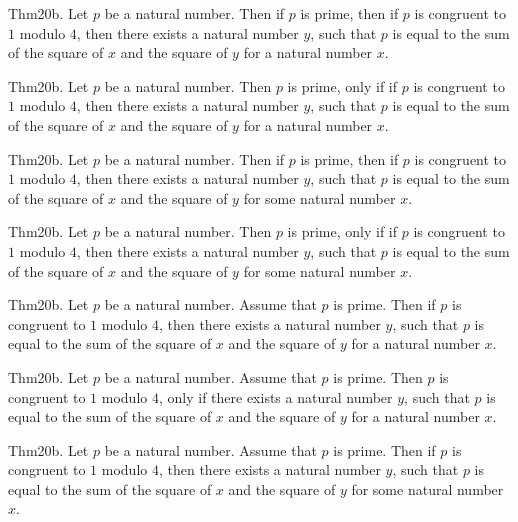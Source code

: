 \documentclass{article}
\begin{document}
Thm20b. Let $p$ be a natural number. Then if $p$ is prime, then if $p$ is congruent to $1$ modulo $4$, then there exists a natural number $y$, such that $p$ is equal to the sum of the square of $x$ and the square of $y$ for a natural number $x$.

Thm20b. Let $p$ be a natural number. Then $p$ is prime, only if if $p$ is congruent to $1$ modulo $4$, then there exists a natural number $y$, such that $p$ is equal to the sum of the square of $x$ and the square of $y$ for a natural number $x$.

Thm20b. Let $p$ be a natural number. Then if $p$ is prime, then if $p$ is congruent to $1$ modulo $4$, then there exists a natural number $y$, such that $p$ is equal to the sum of the square of $x$ and the square of $y$ for some natural number $x$.

Thm20b. Let $p$ be a natural number. Then $p$ is prime, only if if $p$ is congruent to $1$ modulo $4$, then there exists a natural number $y$, such that $p$ is equal to the sum of the square of $x$ and the square of $y$ for some natural number $x$.

Thm20b. Let $p$ be a natural number. Assume that $p$ is prime. Then if $p$ is congruent to $1$ modulo $4$, then there exists a natural number $y$, such that $p$ is equal to the sum of the square of $x$ and the square of $y$ for a natural number $x$.

Thm20b. Let $p$ be a natural number. Assume that $p$ is prime. Then $p$ is congruent to $1$ modulo $4$, only if there exists a natural number $y$, such that $p$ is equal to the sum of the square of $x$ and the square of $y$ for a natural number $x$.

Thm20b. Let $p$ be a natural number. Assume that $p$ is prime. Then if $p$ is congruent to $1$ modulo $4$, then there exists a natural number $y$, such that $p$ is equal to the sum of the square of $x$ and the square of $y$ for some natural number $x$.
\end{document}

